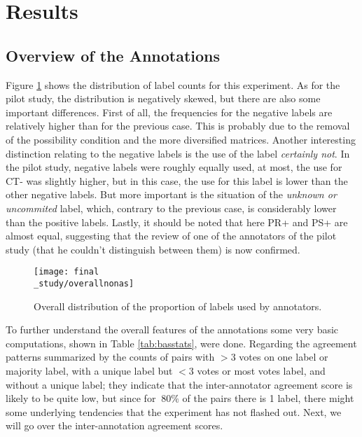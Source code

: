 \section{Results}
\subsection{Overview of the Annotations}\label{subsect:overview}
Figure \ref{fig:allbar} shows the distribution of label counts for this experiment. As for the pilot study, the distribution is negatively skewed, but there are also some important differences. First of all, the frequencies for the negative labels are relatively higher than for the previous case. This is probably due to the removal of the possibility condition and the more diversified matrices. Another interesting distinction relating to the negative labels is the use of the label \textit{certainly not}. In the pilot study, negative labels were roughly equally used, at most, the use for CT- was slightly higher, but in this case, the use for this label is lower than the other negative labels. But more important is the situation of the \textit{unknown or uncommited} label, which, contrary to the previous case, is considerably lower than the positive labels. Lastly, it should be noted that here PR+ and PS+ are almost equal, suggesting that the review of one of the annotators of the pilot study (that he couldn't distinguish between them) is now confirmed.\\

\begin{figure}
\centering
\parbox{10cm}{\texttt{[image: final\\\_study/overallnonas]}
\caption{Overall distribution of the proportion of labels used by annotators.}\label{fig:allbar}}
\qquad
\end{figure}

To further understand the overall features of the annotations some very basic computations, shown in Table \ref{tab:basstats}, were done. Regarding the agreement patterns summarized by the counts of pairs with $>3$ votes on one label or majority label, with a unique label but $<3$ votes or most votes label, and without a unique label; they indicate that the inter-annotator agreement score is likely to be quite low, but since for $~80\%$ of the pairs there is 1 label, there might some underlying tendencies that the experiment has not flashed out. Next, we will go over the inter-annotation agreement scores.\\ 

